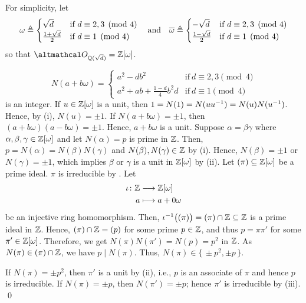 \documentclass[../modern_algebra_2.tex]{subfiles}
\begin{document}
\begin{myclaim}[Proof]
    For simplicity, let
    \[
        \omega \triangleq \begin{cases}
            \sqrt{d} & \text{if}~d \equiv 2, 3 \pmod{4} \\
            \frac{1+\sqrt{d}}{2} & \text{if}~d \equiv 1 \pmod{4}
        \end{cases} \quad\text{and}\quad
        \overline\omega \triangleq \begin{cases}
            -\sqrt{d} & \text{if}~d \equiv 2, 3 \pmod{4} \\
            \frac{1-\sqrt{d}}{2} & \text{if}~d \equiv 1 \pmod{4}
        \end{cases}
    \]
    so that \(\rqi{\sqrt{d}} = \ZZ{}[\omega]\).
\begin{enumerate}[label=(\roman*), listparindent=\parindent]
    \ii
    \[
        N(a + b\omega) = \begin{cases}
            a^2 - db^2 & \text{if}~d \equiv 2, 3 \pmod{4} \\
            a^2 + ab + \frac{1 - d}{4} b^2 d & \text{if}~d \equiv 1 \pmod{4}
        \end{cases}
    \]
    is an integer.
    \ii
    If \(u \in \ZZ{}[\omega]\) is a unit, then \(1 = N(1) = N(u u^{-1}) = N(u) N(u^{-1})\).
    Hence, by (i), \(N(u) = \pm 1\).
    If \(N(a + b\omega) = \pm 1\), then \((a + b \omega)(a - b \omega) = \pm 1\).
    Hence, \(a + b \omega\) is a unit.
    \ii
    Suppose \(\alpha = \beta \gamma\) where \(\alpha, \beta, \gamma \in \ZZ{}[\omega]\)
    and let \(N(\alpha) = p\) is prime in \(\ZZ\).
    Then, \(p = N(\alpha) = N(\beta) N(\gamma)\) and \(N(\beta), N(\gamma) \in \ZZ\) by (i).
    Hence, \(N(\beta) = \pm 1\) or \(N(\gamma) = \pm 1\),
    which implies \(\beta\) or \(\gamma\) is a unit in \(\ZZ{}[\omega]\) by (ii).
    \ii
    Let \((\pi) \subseteq \ZZ{}[\omega]\) be a prime ideal.
    \(\pi\) is irreducible by .
    Let
    \begin{align*}
        \iota \colon \ZZ &\longrightarrow \ZZ{}[\omega] \\
        a &\longmapsto a + 0 \omega
    \end{align*}
    be an injective ring homomorphism.
    Then, \(\iota\inv \bigl((\pi)\bigr) = (\pi) \cap \ZZ \subseteq \ZZ\)
    is a prime ideal in \(\ZZ\).\footnotemark
    Hence, \((\pi) \cap \ZZ = (p)\) for some prime \(p \in \ZZ\),
    and thus \(p = \pi \pi'\) for some \(\pi' \in \ZZ{}[\omega]\).
    Therefore, we get \(N(\pi) N(\pi') = N(p) = p^2\) in \(\ZZ\).
    As \(N(\pi) \in (\pi) \cap \ZZ\), we have \(p \mid N(\pi)\).
    Thus, \(N(\pi) \in \{\,\pm p^2, \pm p\,\}\).

    If \(N(\pi) = \pm p^2\), then \(\pi'\) is a unit by (ii), i.e., \(p\) is an associate of \(\pi\)
    and hence \(p\) is irreducible.
    If \(N(\pi) = \pm p\), then \(N(\pi') = \pm p\); hence \(\pi'\) is irreducible by (iii).
    \qed
\end{enumerate}
\end{myclaim}
\end{document}
